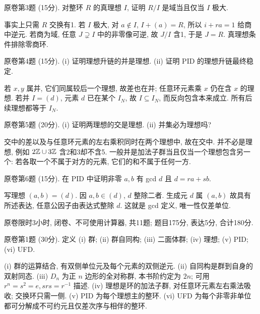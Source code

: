 \begin{exercise}原卷第3题 (15分). 对整环 $R$ 的真理想 $I$, 证明 $R/I$ 是域当且仅当 $I$ 极大.\end{exercise}
\begin{solution}
事实上只需 $R$ 交换有1. 若 $I$ 极大, 对 $a\notin I$, $I+(a)=R$, 所以 $i+ra=1$ 给商中逆元. 若商为域, 任意 $J\supsetneq I$ 中的非零像可逆, 故 $J/I$ 含1, 于是 $J=R$. 真理想条件排除零商环.
\end{solution}
\begin{exercise}原卷第4题 (15分). (i) 证明理想升链的并是理想. (ii) 证明 PID 的理想升链最终稳定.\end{exercise}
\begin{solution}
若 $x,y$ 属并, 它们同属较后一个理想, 故差也在并; 任意环元素乘 $x$ 仍在含 $x$ 的理想. 若并 $I=(d)$, 元素 $d$ 已在某个 $I_N$, 故 $I\subseteq I_N$, 而反向包含本来成立. 所有后续理想都等于 $I_N$.
\end{solution}
\begin{exercise}原卷第5题 (20分). (i) 证明两理想的交是理想. (ii) 并集必为理想吗?\end{exercise}
\begin{solution}
交中的差以及与任意环元素的左右乘积同时在两个理想中, 故在交中. 并不必是理想, 例如 $2\mathbb Z\cup3\mathbb Z$ 含2和3却不含5. 一般并是加法子群当且仅当一个理想包含另一个: 若各取一个不属于对方的元素, 它们的和不属于任何一方.
\end{solution}
\begin{exercise}原卷第6题 (15分). 在 PID 中证明非零 $a,b$ 有 gcd $d$ 且 $d=ra+sb$.\end{exercise}
\begin{solution}
写理想 $(a,b)=(d)$. 因 $a,b\in(d)$, $d$ 整除二者. 生成元 $d$ 属 $(a,b)$ 故具有所述表达, 任意公因子由表达式整除 $d$. 这就是 gcd 定义, 唯一性仅差单位.
\end{solution}
原卷限时3小时, 闭卷、不可使用计算器, 共11题; 题目175分, 表达5分, 合计180分.
\begin{exercise}原卷第1题 (30分). 定义 (i) 群; (ii) 群自同构; (iii) 二面体群; (iv) 理想; (v) PID; (vi) UFD.\end{exercise}
\begin{solution}
(i) 群的运算结合, 有双侧单位元及每个元素的双侧逆元. (ii) 自同构是群到自身的双射同态. (iii) $D_n$ 为正 $n$ 边形的全对称群, 本书阶约定为 $2n$; 可用 $r^n=s^2=e,srs=r^{-1}$ 描述. (iv) 理想是环的加法子群, 对任意环元素左右乘法吸收; 交换环只需一侧. (v) PID 为每个理想主的整环. (vi) UFD 为每个非零非单位都可分解成不可约元且仅差次序与相伴的整环.
\end{solution}

